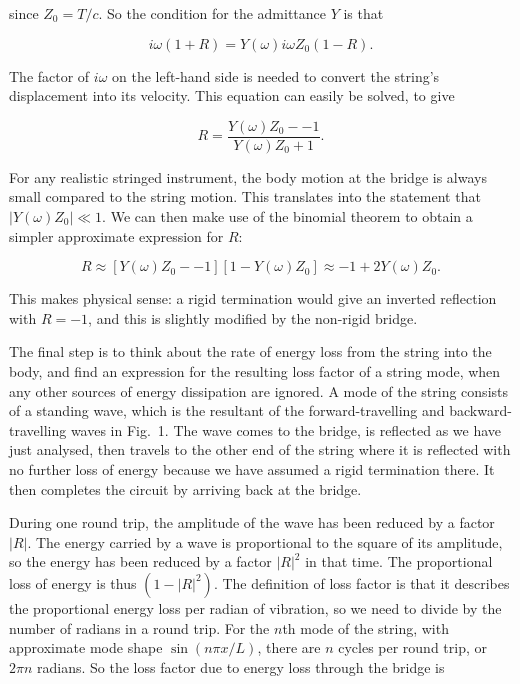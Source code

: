  \noindent{}since $Z_0=T/c$. So the condition for the admittance $Y$ is that 

  \begin{equation*}i \omega (1+R) = Y(\omega) i \omega Z_0 (1-R) 
  .\tag{3}\end{equation*} 

  The factor of $i \omega$ on the left-hand side is needed to convert the 
  string's displacement into its velocity. This equation can easily be solved, 
  to give 

  \begin{equation*}R=\dfrac{Y(\omega) Z_0 -- 1}{Y(\omega) Z_0 + 1} 
  .\tag{4}\end{equation*} 

  For any realistic stringed instrument, the body motion at the bridge is 
  always small compared to the string motion. This translates into the 
  statement that $|Y(\omega) Z_0| \ll 1$. We can then make use of the binomial 
  theorem to obtain a simpler approximate expression for $R$: 

  \begin{equation*}R \approx [Y(\omega) Z_0 -- 1][1-Y(\omega) Z_0] \approx -1 
  +2Y(\omega) Z_0 .\tag{5}\end{equation*} 

  This makes physical sense: a rigid termination would give an inverted 
  reflection with $R=-1$, and this is slightly modified by the non-rigid 
  bridge. 

  The final step is to think about the rate of energy loss from the string into 
  the body, and find an expression for the resulting loss factor of a string 
  mode, when any other sources of energy dissipation are ignored. A mode of the 
  string consists of a standing wave, which is the resultant of the 
  forward-travelling and backward-travelling waves in Fig.\ 1. The wave comes 
  to the bridge, is reflected as we have just analysed, then travels to the 
  other end of the string where it is reflected with no further loss of energy 
  because we have assumed a rigid termination there. It then completes the 
  circuit by arriving back at the bridge. 

  During one round trip, the amplitude of the wave has been reduced by a factor 
  $|R|$. The energy carried by a wave is proportional to the square of its 
  amplitude, so the energy has been reduced by a factor $|R|^2$ in that time. 
  The proportional loss of energy is thus $(1-|R|^2)$. The definition of loss 
  factor is that it describes the proportional energy loss per radian of 
  vibration, so we need to divide by the number of radians in a round trip. For 
  the $n$th mode of the string, with approximate mode shape $\sin (n \pi x/L)$, 
  there are $n$ cycles per round trip, or $2 \pi n$ radians. So the loss factor 
  due to energy loss through the bridge is 


